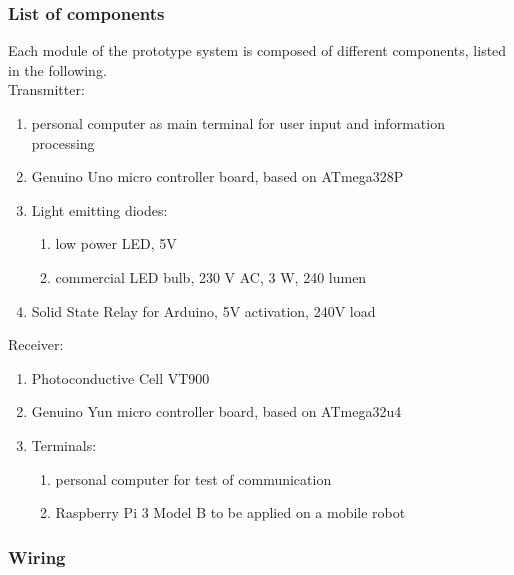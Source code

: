 \subsubsection{List of components}
\label{components}
Each module of the prototype system is composed of different components, listed in the following.\\
Transmitter:
\begin{enumerate}
\item personal computer as main terminal for user input and information processing
\item Genuino Uno micro controller board, based on ATmega328P \cite{genuinouno}
\item Light emitting diodes:
\begin{enumerate}
\item low power LED, 5V 
\item commercial LED bulb, 230 V AC, 3 W, 240 lumen
\end{enumerate}
\item Solid State Relay for Arduino, 5V activation, 240V load
\end{enumerate}
Receiver:
\begin{enumerate}
\item Photoconductive Cell VT900
\item Genuino Yun micro controller board, based on ATmega32u4 \cite{arduinoyun}
\item Terminals:
\begin{enumerate}
\item personal computer for test of communication
\item Raspberry Pi 3 Model B to be applied on a mobile robot
\end{enumerate}
\end{enumerate}

\subsubsection{Wiring}

